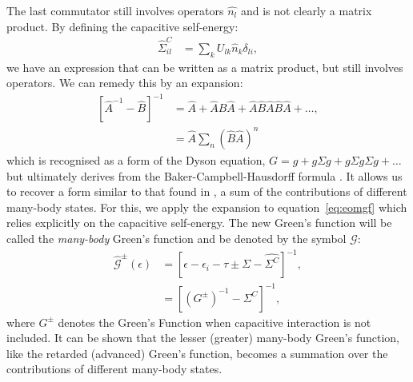 \documentclass{article}
\begin{document}
\begin{multicols}{2}
        The last commutator still involves operators $\hat{n_l}$ and is not clearly a matrix product. By defining the capacitive self-energy: 
        \begin{align*}
        \hat{\Sigma}^C_{il} &= \sum_k U_{lk} \hat{n}_k \delta_{li},
        \end{align*}
        we have an expression that can be written as a matrix product, but still involves operators. We can remedy this by an expansion:
        \begin{align}
        \left[ \hat{A}^{-1} - \hat{B}\right]^{-1} &=\hat{A} + \hat{A}\hat{B}\hat{A} + \hat{A}\hat{B}\hat{A}\hat{B}\hat{A} + \ldots,
         \nonumber\\
        &= \hat{A} \sum_n \left(\hat{B}\hat{A}\right)^n\label{eq:expansion}
        \end{align} 
        which is recognised as a form of the Dyson equation, $G = g + g\Sigma g + g\Sigma g \Sigma g + \ldots$ but ultimately derives from the Baker-Campbell-Hausdorff formula  \cite{Mattuck1976}. It allows us to recover a form similar to that found in \citet{haugjauho}, a sum of the contributions of different many-body states. For this, we apply the expansion to equation~\ref{eq:eomgf} which relies explicitly on the capacitive self-energy. The new Green's function will be called the \emph{many-body} Green's function and be denoted by the symbol $\mathscr{G}$:
        \begin{align}
            \mathscr{\hat{G}}^\pm(\epsilon) &= \left[ \epsilon - \epsilon_i - \tau \pm \Sigma - \hat{\Sigma^C}\right]^{-1}, \\
            &= \left[ \left(G^\pm\right)^{-1}- \hat{\Sigma^C}\right]^{-1} ,\nonumber
        \end{align}
        where $G^\pm$ denotes the Green's Function when capacitive interaction is not included. It can be shown that the lesser (greater) many-body Green's function, like the retarded (advanced) Green's function, becomes a summation over the contributions of different many-body states.
        

\end{multicols}
\end{document}
